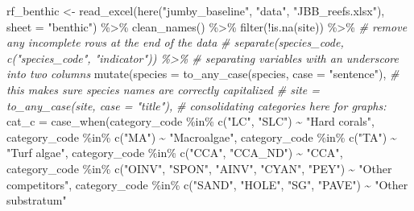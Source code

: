 \documentclass[
]{article}
\newenvironment{Shaded}{\begin{snugshade}}{\end{snugshade}}
\newcommand{\AttributeTok}[1]{\textcolor[rgb]{0.77,0.63,0.00}{#1}}
\newcommand{\CommentTok}[1]{\textcolor[rgb]{0.56,0.35,0.01}{\textit{#1}}}
\newcommand{\FunctionTok}[1]{\textcolor[rgb]{0.00,0.00,0.00}{#1}}
\newcommand{\NormalTok}[1]{#1}
\newcommand{\OtherTok}[1]{\textcolor[rgb]{0.56,0.35,0.01}{#1}}
\newcommand{\SpecialCharTok}[1]{\textcolor[rgb]{0.00,0.00,0.00}{#1}}
\newcommand{\StringTok}[1]{\textcolor[rgb]{0.31,0.60,0.02}{#1}}
\begin{document}
\begin{Shaded}
\begin{Highlighting}[]
\NormalTok{rf\_benthic }\OtherTok{\textless{}{-}} \FunctionTok{read\_excel}\NormalTok{(}\FunctionTok{here}\NormalTok{(}\StringTok{"jumby\_baseline"}\NormalTok{, }\StringTok{"data"}\NormalTok{, }\StringTok{"JBB\_reefs.xlsx"}\NormalTok{), }\AttributeTok{sheet =} \StringTok{"benthic"}\NormalTok{) }\SpecialCharTok{\%\textgreater{}\%}  
  \FunctionTok{clean\_names}\NormalTok{() }\SpecialCharTok{\%\textgreater{}\%}
  \FunctionTok{filter}\NormalTok{(}\SpecialCharTok{!}\FunctionTok{is.na}\NormalTok{(site)) }\SpecialCharTok{\%\textgreater{}\%} \CommentTok{\# remove any incomplete rows at the end of the data}
  \CommentTok{\# separate(species\_code, c("species\_code", "indicator")) \%\textgreater{}\% \# separating variables with an underscore into two columns}
  \FunctionTok{mutate}\NormalTok{(}\AttributeTok{species =} \FunctionTok{to\_any\_case}\NormalTok{(species, }\AttributeTok{case =} \StringTok{"sentence"}\NormalTok{), }\CommentTok{\# this makes sure species names are correctly capitalized}
         \CommentTok{\# site = to\_any\_case(site, case = "title"),}
         \CommentTok{\# consolidating categories here for graphs:}
         \AttributeTok{cat\_c =} \FunctionTok{case\_when}\NormalTok{(category\_code }\SpecialCharTok{\%in\%} \FunctionTok{c}\NormalTok{(}\StringTok{"LC"}\NormalTok{, }\StringTok{"SLC"}\NormalTok{) }\SpecialCharTok{\textasciitilde{}} \StringTok{"Hard corals"}\NormalTok{,}
\NormalTok{                                  category\_code }\SpecialCharTok{\%in\%} \FunctionTok{c}\NormalTok{(}\StringTok{"MA"}\NormalTok{) }\SpecialCharTok{\textasciitilde{}} \StringTok{"Macroalgae"}\NormalTok{,}
\NormalTok{                                  category\_code }\SpecialCharTok{\%in\%} \FunctionTok{c}\NormalTok{(}\StringTok{"TA"}\NormalTok{) }\SpecialCharTok{\textasciitilde{}} \StringTok{"Turf algae"}\NormalTok{,}
\NormalTok{                                  category\_code }\SpecialCharTok{\%in\%} \FunctionTok{c}\NormalTok{(}\StringTok{"CCA"}\NormalTok{, }\StringTok{"CCA\_ND"}\NormalTok{) }\SpecialCharTok{\textasciitilde{}} \StringTok{"CCA"}\NormalTok{,}
\NormalTok{                                  category\_code }\SpecialCharTok{\%in\%} \FunctionTok{c}\NormalTok{(}\StringTok{"OINV"}\NormalTok{, }\StringTok{"SPON"}\NormalTok{, }\StringTok{"AINV"}\NormalTok{, }\StringTok{"CYAN"}\NormalTok{, }\StringTok{"PEY"}\NormalTok{) }\SpecialCharTok{\textasciitilde{}} \StringTok{"Other competitors"}\NormalTok{,}
\NormalTok{                                  category\_code }\SpecialCharTok{\%in\%} \FunctionTok{c}\NormalTok{(}\StringTok{"SAND"}\NormalTok{, }\StringTok{"HOLE"}\NormalTok{, }\StringTok{"SG"}\NormalTok{, }\StringTok{"PAVE"}\NormalTok{) }\SpecialCharTok{\textasciitilde{}} \StringTok{"Other substratum"}

\end{Highlighting}
\end{Shaded}
\end{document}

